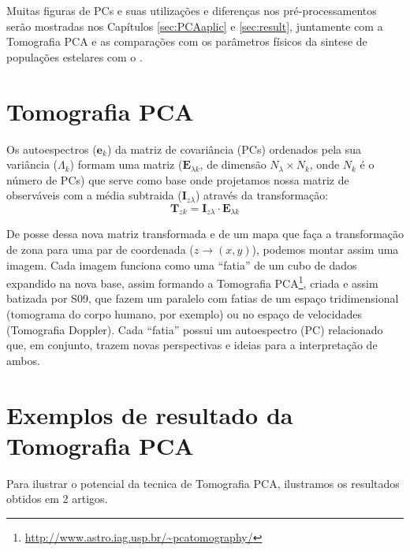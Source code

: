 Muitas figuras de PCs e suas utilizações e diferenças nos pré-processamentos serão mostradas nos Capítulos
\ref{sec:PCAaplic} e \ref{sec:result}, juntamente com a Tomografia PCA e as comparações com os parâmetros físicos da
sintese de populações estelares com o \starlight.


\section{Tomografia PCA}
\label{sec:PCAeTomoPCA:TomoPCA}

Os autoespectros ($\mathbf{e}_k$) da matriz de covariância (PCs) ordenados pela sua variância ($\Lambda_k$) formam uma matriz
($\mathbf{E}{}_{\lambda k}$, de dimensão $N_\lambda \times N_k$, onde $N_k$ é o número de PCs) que serve como base onde
projetamos nossa matriz de observáveis com a média subtraida ($\mathbf{I}{}_{z \lambda}$) através da transformação:
\begin{equation}
	\label{eq:TomoPCA:tomogram2D}
	\mathbf{T}{}_{z k} = \mathbf{I}{}_{z \lambda} \cdot \mathbf{E}{}_{\lambda k}
\end{equation}

De posse dessa nova matriz transformada e de um mapa que faça a transformação de zona para uma par de coordenada ($z \to
(x, y)$), podemos montar assim uma imagem. Cada imagem funciona como uma ``fatia'' de um cubo de dados expandido na nova
base, assim formando a Tomografia PCA\footnote{\url{http://www.astro.iag.usp.br/~pcatomography/}}, criada e assim
batizada por S09, que fazem um paralelo com fatias de um espaço tridimensional (tomograma do corpo humano, por exemplo)
ou no espaço de velocidades (Tomografia Doppler). Cada ``fatia'' possui um autoespectro (PC) relacionado que, em
conjunto, trazem novas perspectivas e ideias para a interpretação de ambos.

\section{Exemplos de resultado da Tomografia PCA}

Para ilustrar o potencial da tecnica de Tomografia PCA, ilustramos os resultados obtidos em 2 artigos.

